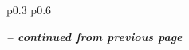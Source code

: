 \begin{center}
\renewcommand*{\arraystretch}{1.5}
\begin{longtable}{ p{} p{} }

\endfirsthead

%
{{\bfseries \emph{-- continued from previous page}}} \\
\toprule[0.25mm] 
\endhead

\hline {} \\
\endfoot

\bottomrule
\endlastfoot


\end{longtable}
\end{center}
